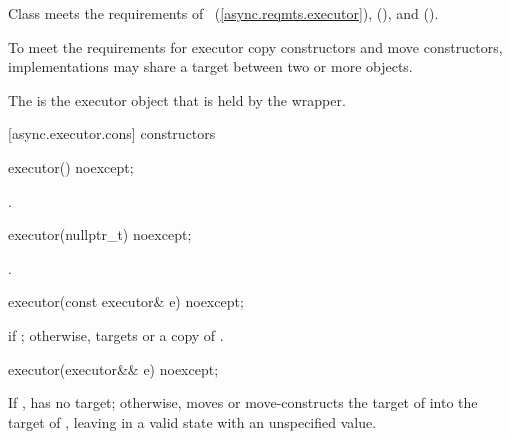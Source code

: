 \pnum
Class  meets the requirements of ~(\ref{async.reqmts.executor}),  (), and  ().

\pnum
\begin{note} To meet the  requirements for executor copy constructors and move constructors, implementations may share a target between two or more  objects. \end{note}

\pnum
The  is the executor object that is held by the wrapper.


[async.executor.cons]{ constructors}

%
\begin{itemdecl}
executor() noexcept;
\end{itemdecl}

\begin{itemdescr}
\pnum
\postconditions {}.
\end{itemdescr}

%
\begin{itemdecl}
executor(nullptr_t) noexcept;
\end{itemdecl}

\begin{itemdescr}
\pnum
\postconditions {}.
\end{itemdescr}

%
\begin{itemdecl}
executor(const executor& e) noexcept;
\end{itemdecl}

\begin{itemdescr}
\pnum
\postconditions {} if ; otherwise,  targets  or a copy of .
\end{itemdescr}

%
\begin{itemdecl}
executor(executor&& e) noexcept;
\end{itemdecl}

\begin{itemdescr}
\pnum
\effects If ,  has no target; otherwise, moves  or move-constructs the target of  into the target of , leaving  in a valid state with an unspecified value.
\end{itemdescr}

